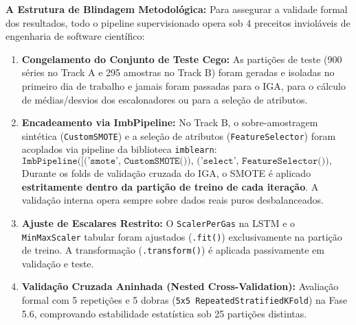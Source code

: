 \documentclass[10pt,a4paper]{article}
\begin{document}
\begin{defesabox}
\textbf{A Estrutura de Blindagem Metodológica:}
Para assegurar a validade formal dos resultados, todo o pipeline supervisionado opera sob 4 preceitos invioláveis de engenharia de software científico:
\begin{enumerate}[leftmargin=*,itemsep=1pt]
  \item \textbf{Congelamento do Conjunto de Teste Cego:} As partições de teste (900 séries no Track A e 295 amostras no Track B) foram geradas e isoladas no primeiro dia de trabalho e jamais foram passadas para o IGA, para o cálculo de médias/desvios dos escalonadores ou para a seleção de atributos.
  \item \textbf{Encadeamento via ImbPipeline:} No Track B, o sobre-amostragem sintética (\texttt{CustomSMOTE}) e a seleção de atributos (\texttt{FeatureSelector}) foram acoplados via pipeline da biblioteca \texttt{imblearn}:
  $$\texttt{ImbPipeline([('smote', CustomSMOTE()), ('select', FeatureSelector()), ('clf', XGBClassifier())])}$$
  Durante os folds de validação cruzada do IGA, o SMOTE é aplicado \textbf{estritamente dentro da partição de treino de cada iteração}. A validação interna opera sempre sobre dados reais puros desbalanceados.
  \item \textbf{Ajuste de Escalares Restrito:} O \texttt{ScalerPerGas} na LSTM e o \texttt{MinMaxScaler} tabular foram ajustados (\texttt{.fit()}) exclusivamente na partição de treino. A transformação (\texttt{.transform()}) é aplicada passivamente em validação e teste.
  \item \textbf{Validação Cruzada Aninhada (Nested Cross-Validation):} Avaliação formal com 5 repetições e 5 dobras (\texttt{5x5 RepeatedStratifiedKFold}) na Fase 5.6, comprovando estabilidade estatística sob 25 partições distintas.
\end{enumerate}
\end{defesabox}
\end{document}
